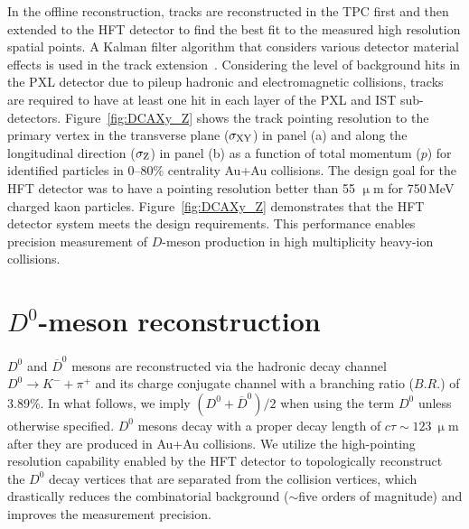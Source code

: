 \documentclass[%
 reprint,	
 amsmath,amssymb,
 aps,
 prc,
]{revtex4-1}
\begin{document}
In the offline reconstruction, tracks are reconstructed in the TPC first and then extended to the HFT detector to find the best fit to the measured high resolution spatial points. A Kalman filter algorithm that considers various detector material effects is used in the track extension~\cite{Kalman}. Considering the level of background hits in the PXL detector due to pileup hadronic and electromagnetic collisions, tracks are required to have at least one hit in each layer of the PXL and IST sub-detectors. Figure~\ref{fig:DCAXy_Z} shows the track pointing resolution to the primary vertex in the transverse plane ($\sigma_{\rm XY}$) in panel (a) and along the longitudinal direction ($\sigma_{\rm Z}$) in panel (b) as a function of total momentum ($p$) for identified particles in 0--80\% centrality Au+Au collisions. The design goal for the HFT detector was to have a pointing resolution better than 55 $\upmu$m for 750\,MeV charged kaon particles. Figure~\ref{fig:DCAXy_Z} demonstrates that the HFT detector system meets the design requirements. This performance enables precision measurement of $D$-meson production in high multiplicity heavy-ion collisions.


\section{$D^0$-meson reconstruction}
\label{D0recon}

$D^0$ and $\overline{D}^{0}$ mesons are reconstructed via the hadronic decay channel $D^0\rightarrow K^-+\pi^+$ and its charge conjugate channel with a branching ratio ($B.R.$) of 3.89\%. In what follows, we imply $(D^0 +\overline{D}^{0})/2$ when using the term $D^0$ unless otherwise specified. $D^0$ mesons decay with a proper decay length of $c\tau\sim123\ \upmu$m after they are produced in Au+Au collisions. We utilize the high-pointing resolution capability enabled by the HFT detector to topologically reconstruct the $D^0$ decay vertices that are separated from the collision vertices, which drastically reduces the combinatorial background ($\sim$five orders of magnitude) and improves the measurement precision.
\end{document}
